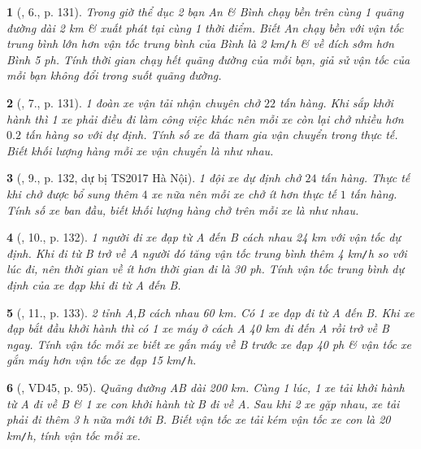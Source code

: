 \documentclass{article}
\newtheorem{baitoan}{}
\begin{document}
\begin{baitoan}[\cite{Kien_dai_so_9}, 6., p. 131]
	Trong giờ thể dục 2 bạn An \& Bình chạy bền trên cùng 1 quãng đường dài {\rm2 km} \& xuất phát tại cùng 1 thời điểm. Biết An chạy bền với vận tốc trung bình lớn hơn vận tốc trung bình của Bình là {\rm2 km{\tt/}h} \& về đích sớm hơn Bình {\rm5 ph}. Tính thời gian chạy hết quãng đường của mỗi bạn, giả sử vận tốc của mỗi bạn không đổi trong suốt quãng đường.
\end{baitoan}

\begin{baitoan}[\cite{Kien_dai_so_9}, 7., p. 131]
	1 đoàn xe vận tải nhận chuyên chở $22$ tấn hàng. Khi sắp khởi hành thì 1 xe phải điều đi làm công việc khác nên mỗi xe còn lại chở nhiều hơn $0.2$ tấn hàng so với dự định. Tính số xe đã tham gia vận chuyển trong thực tế. Biết khối lượng hàng mỗi xe vận chuyển là như nhau.
\end{baitoan}

\begin{baitoan}[\cite{Kien_dai_so_9}, 9., p. 132, dự bị TS2017 Hà Nội]
	1 đội xe dự định chở $24$ tấn hàng. Thực tế khi chở được bổ sung thêm $4$ xe nữa nên mỗi xe chở ít hơn thực tế $1$ tấn hàng. Tính số xe ban đầu, biết khối lượng hàng chở trên mỗi xe là như nhau.
\end{baitoan}

\begin{baitoan}[\cite{Kien_dai_so_9}, 10., p. 132]
	1 người đi xe đạp từ A đến B cách nhau {\rm24 km} với vận tốc dự định. Khi đi từ B trở về A người đó tăng vận tốc trung bình thêm {\rm4 km{\tt/}h} so với lúc đi, nên thời gian về ít hơn thời gian đi là {\rm30 ph}. Tính vận tốc trung bình dự định của xe đạp khi đi từ A đến B.
\end{baitoan}

\begin{baitoan}[\cite{Kien_dai_so_9}, 11., p. 133]
	2 tỉnh A,B cách nhau {\rm60 km}. Có 1 xe đạp đi từ A đến B. Khi xe đạp bắt đầu khởi hành thì có 1 xe máy ở cách A {\rm40 km} đi đến A rồi trở về B ngay. Tính vận tốc mỗi xe biết xe gắn máy về B trước xe đạp {\rm40 ph} \& vận tốc xe gắn máy hơn vận tốc xe đạp {\rm15 km{\tt/}h}.
\end{baitoan}

\begin{baitoan}[\cite{Tuyen_Toan_9_old}, VD45, p. 95]
	Quãng đường AB dài {\rm200 km}. Cùng 1 lúc, 1 xe tải khởi hành từ A đi về B \& 1 xe con khởi hành từ B đi về A. Sau khi 2 xe gặp nhau, xe tải phải đi thêm {\rm3 h} nữa mới tới B. Biết vận tốc xe tải kém vận tốc xe con là {\rm20 km{\tt/}h}, tính vận tốc mỗi xe.
\end{baitoan}
\end{document}
